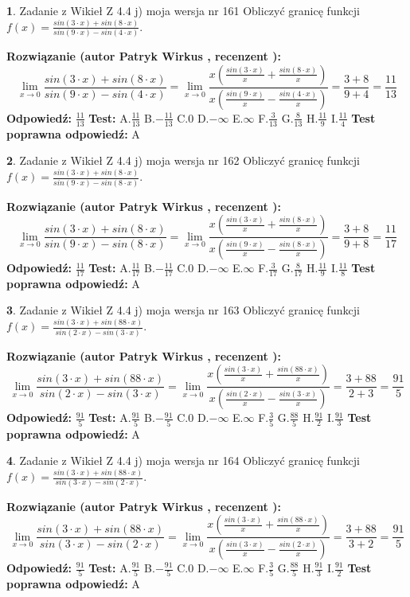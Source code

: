 \documentclass[12pt, a4paper]{article}
\theoremstyle{definition} %
\newtheorem{zad}{}
\newcommand{\zadStart}[1]{\begin{zad}#1\newline}
\newcommand{\zadStop}{\end{zad}}
\newcommand{\rozwStart}[2]{\noindent \textbf{Rozwiązanie (autor #1 , recenzent #2): }\newline}
\newcommand{\rozwStop}{\newline}
\newcommand{\odpStart}{\noindent \textbf{Odpowiedź:}\newline}
\newcommand{\odpStop}{\newline}
\newcommand{\testStart}{\noindent \textbf{Test:}\newline}
\newcommand{\testStop}{\newline}
\newcommand{\kluczStart}{\noindent \textbf{Test poprawna odpowiedź:}\newline}
\newcommand{\kluczStop}{\newline}
\begin{document}
\zadStart{Zadanie z Wikieł Z 4.4 j) moja wersja nr 161}
Obliczyć granicę funkcji $f(x)=\frac{sin(3\cdot x) +sin(8\cdot x)}{sin(9\cdot x) -sin(4\cdot x)}$.
\zadStop
\rozwStart{Patryk Wirkus}{}
$$\lim\limits_{x\to 0}\frac{sin(3\cdot x) +sin(8\cdot x)}{sin(9\cdot x) -sin(4\cdot x)}=\lim\limits_{x\to 0}\frac{x(\frac{sin(3\cdot x)}{x}+\frac{sin(8\cdot x)}{x})}{x(\frac{sin(9\cdot x)}{x}-\frac{sin(4\cdot x)}{x})}=\frac{3+8}{9+4} = \frac{11}{13}$$
\rozwStop
\odpStart
$\frac{11}{13}$
\odpStop
\testStart
A.$\frac{11}{13}$
B.$-\frac{11}{13}$
C.$0$
D.$-\infty$
E.$\infty$
F.$\frac{3}{13}$
G.$\frac{8}{13}$
H.$\frac{11}{9}$
I.$\frac{11}{4}$
\testStop
\kluczStart
A
\kluczStop



\zadStart{Zadanie z Wikieł Z 4.4 j) moja wersja nr 162}
Obliczyć granicę funkcji $f(x)=\frac{sin(3\cdot x) +sin(8\cdot x)}{sin(9\cdot x) -sin(8\cdot x)}$.
\zadStop
\rozwStart{Patryk Wirkus}{}
$$\lim\limits_{x\to 0}\frac{sin(3\cdot x) +sin(8\cdot x)}{sin(9\cdot x) -sin(8\cdot x)}=\lim\limits_{x\to 0}\frac{x(\frac{sin(3\cdot x)}{x}+\frac{sin(8\cdot x)}{x})}{x(\frac{sin(9\cdot x)}{x}-\frac{sin(8\cdot x)}{x})}=\frac{3+8}{9+8} = \frac{11}{17}$$
\rozwStop
\odpStart
$\frac{11}{17}$
\odpStop
\testStart
A.$\frac{11}{17}$
B.$-\frac{11}{17}$
C.$0$
D.$-\infty$
E.$\infty$
F.$\frac{3}{17}$
G.$\frac{8}{17}$
H.$\frac{11}{9}$
I.$\frac{11}{8}$
\testStop
\kluczStart
A
\kluczStop



\zadStart{Zadanie z Wikieł Z 4.4 j) moja wersja nr 163}
Obliczyć granicę funkcji $f(x)=\frac{sin(3\cdot x) +sin(88\cdot x)}{sin(2\cdot x) -sin(3\cdot x)}$.
\zadStop
\rozwStart{Patryk Wirkus}{}
$$\lim\limits_{x\to 0}\frac{sin(3\cdot x) +sin(88\cdot x)}{sin(2\cdot x) -sin(3\cdot x)}=\lim\limits_{x\to 0}\frac{x(\frac{sin(3\cdot x)}{x}+\frac{sin(88\cdot x)}{x})}{x(\frac{sin(2\cdot x)}{x}-\frac{sin(3\cdot x)}{x})}=\frac{3+88}{2+3} = \frac{91}{5}$$
\rozwStop
\odpStart
$\frac{91}{5}$
\odpStop
\testStart
A.$\frac{91}{5}$
B.$-\frac{91}{5}$
C.$0$
D.$-\infty$
E.$\infty$
F.$\frac{3}{5}$
G.$\frac{88}{5}$
H.$\frac{91}{2}$
I.$\frac{91}{3}$
\testStop
\kluczStart
A
\kluczStop



\zadStart{Zadanie z Wikieł Z 4.4 j) moja wersja nr 164}
Obliczyć granicę funkcji $f(x)=\frac{sin(3\cdot x) +sin(88\cdot x)}{sin(3\cdot x) -sin(2\cdot x)}$.
\zadStop
\rozwStart{Patryk Wirkus}{}
$$\lim\limits_{x\to 0}\frac{sin(3\cdot x) +sin(88\cdot x)}{sin(3\cdot x) -sin(2\cdot x)}=\lim\limits_{x\to 0}\frac{x(\frac{sin(3\cdot x)}{x}+\frac{sin(88\cdot x)}{x})}{x(\frac{sin(3\cdot x)}{x}-\frac{sin(2\cdot x)}{x})}=\frac{3+88}{3+2} = \frac{91}{5}$$
\rozwStop
\odpStart
$\frac{91}{5}$
\odpStop
\testStart
A.$\frac{91}{5}$
B.$-\frac{91}{5}$
C.$0$
D.$-\infty$
E.$\infty$
F.$\frac{3}{5}$
G.$\frac{88}{5}$
H.$\frac{91}{3}$
I.$\frac{91}{2}$
\testStop
\kluczStart
A
\kluczStop
\end{document}
